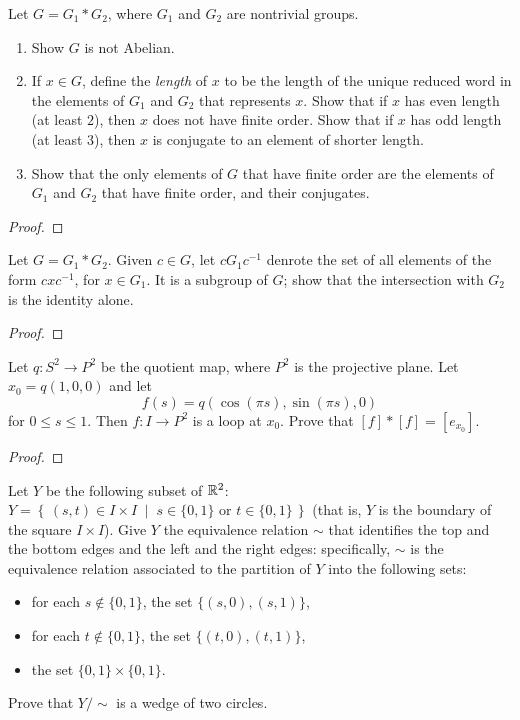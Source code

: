 \newpage
\begin{problem}[Munkres \S69, Ex.\,2(a,b,c)]
Let $G=G_1*G_2$, where $G_1$ and $G_2$ are nontrivial groups.
\begin{enumerate}[label=(\alph*)]
\item Show $G$ is not Abelian.
\item If $x\in G$, define the \emph{length} of $x$ to be the length of the
  unique reduced word in the elements of $G_1$ and $G_2$ that represents
  $x$. Show that if $x$ has even length (at least $2$), then $x$ does not
  have finite order. Show that if $x$ has odd length (at least $3$), then
  $x$ is conjugate to an element of shorter length.
\item Show that the only elements of $G$ that have finite order are the
  elements of $G_1$ and $G_2$ that have finite order, and their
  conjugates.
\end{enumerate}
\end{problem}
\begin{proof}
\end{proof}
\newpage
\begin{problem}[Munkres \S69, Ex.\,3]
Let $G=G_1*G_2$. Given $c\in G$, let $cG_1c^{-1}$ denrote the set of all
elements of the form $cxc^{-1}$, for $x\in G_1$. It is a subgroup of $G$;
show that the intersection with $G_2$ is the identity alone.
\end{problem}
\begin{proof}
\end{proof}
\newpage
\begin{problem}[A]
Let $q\colon S^2\to P^2$ be the quotient map, where $P^2$ is the
projective plane. Let $x_0=q(1,0,0)$ and let
\[f(s)=q(\cos(\pi s),\sin(\pi s),0)\]
for $0\leq s\leq 1$. Then $f\colon I\to P^2$ is a loop at
$x_0$. Prove that $[f]*[f]=[e_{x_0}]$.
\end{problem}
\begin{proof}
\end{proof}
\newpage
\begin{problem}[B]
Let $Y$ be the following subset of $\mathbb{R}^2$: $Y=\left\{\,(s,t)\in
  I\times I\;\middle|\;\text{$s\in\{0,1\}$ or
    $t\in\{0,1\}$}\,\right\}$ (that is, $Y$ is the boundary of
the square $I\times I$). Give $Y$ the equivalence relation $\sim$
that identifies the top and the bottom edges and the left and the
right edges: specifically, $\sim$ is the equivalence relation
associated to the partition of $Y$ into the following sets:
\begin{itemize}
\item for each $s\notin\{0,1\}$, the set $\{(s,0),(s,1)\}$,
\item for each $t\notin\{0,1\}$, the set $\{(t,0),(t,1)\}$,
\item the set $\{0,1\}\times\{0,1\}$.
\end{itemize}
Prove that $Y/\sim$ is a wedge of two circles.
\end{problem}
